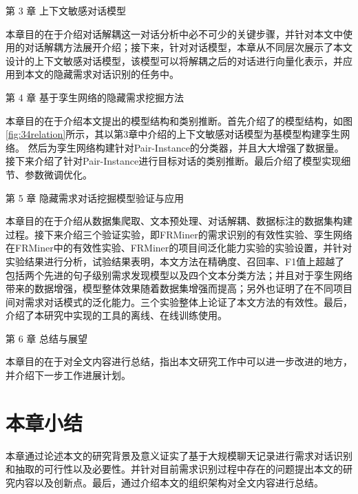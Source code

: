 第 3 章 上下文敏感对话模型

本章目的在于介绍对话解耦这一对话分析中必不可少的关键步骤，并针对本文中使用的对话解耦方法展开介绍；接下来，针对对话模型，本章从不同层次展示了本文设计的上下文敏感对话模型{\dm}，该模型可以将解耦之后的对话进行向量化表示，并应用到本文的隐藏需求对话识别的任务中。


第 4 章 基于孪生网络的隐藏需求挖掘方法

本章目的在于介绍本文提出的{\tool}模型结构和类别推断。首先介绍了{\tool}的模型结构，如图\ref{fig:34relation}所示，其以第3章中介绍的上下文敏感对话模型{\dm}为基模型构建孪生网络。
然后为孪生网络构建针对Pair-Instance的分类器，并且大大增强了数据量。接下来介绍了针对Pair-Instance进行目标对话的类别推断。最后介绍了模型实现细节、参数微调优化。



第 5 章 隐藏需求对话挖掘模型验证与应用

本章目的在于介绍从数据集爬取、文本预处理、对话解耦、数据标注的数据集构建过程。接下来介绍三个验证实验，即FRMiner的需求识别的有效性实验、孪生网络在FRMiner中的有效性实验、FRMiner的项目间泛化能力实验的实验设置，并针对实验结果进行分析，试验结果表明，本文方法在精确度、召回率、F1值上超越了包括两个先进的句子级别需求发现模型以及四个文本分类方法；并且对于孪生网络带来的数据增强，模型整体效果随着数据集增强而提高；另外也证明了{\tool}在不同项目间对需求对话模式的泛化能力。三个实验整体上论证了本文方法的有效性。最后，介绍了本研究中实现的{\tool}工具的离线、在线训练使用。

第 6 章 总结与展望

本章目的在于对全文内容进行总结，指出本文研究工作中可以进一步改进的地方，并介绍下一步工作进展计划。 


\section{本章小结}

本章通过论述本文的研究背景及意义证实了基于大规模聊天记录进行需求对话识别和抽取的可行性以及必要性。并针对目前需求识别过程中存在的问题提出本文的研究内容以及创新点。最后，通过介绍本文的组织架构对全文内容进行总结。 